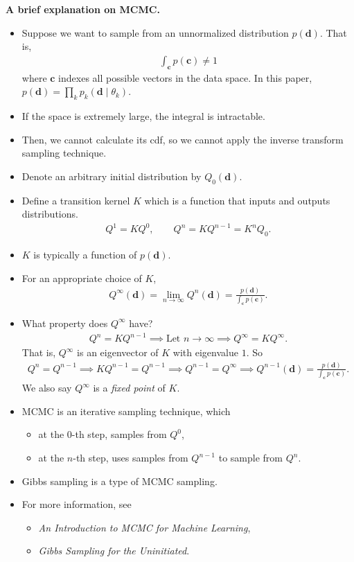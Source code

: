 \documentclass[10pt]{article}
\begin{document}
\textbf{A brief explanation on MCMC.}
\begin{itemize}
\item Suppose we want to sample from an unnormalized distribution $p(\mathbf{d})$. That is,
\begin{align*}
\int_\mathbf{c} p(\mathbf{c}) \neq 1
\end{align*}
where $\mathbf{c}$ indexes all possible vectors in the data space. In this paper, $p(\mathbf{d}) = \prod_k p_k(\mathbf{d} \mid \theta_k)$.
\item If the space is extremely large, the integral is intractable.
\item Then, we cannot calculate its cdf, so we cannot apply the inverse transform sampling technique.
\item Denote an arbitrary initial distribution by $Q_0(\mathbf{d})$.
\item Define a transition kernel $K$ which is a function that inputs and outputs distributions.
\begin{align*}
Q^1 = K Q^0, \qquad Q^n = K Q^{n - 1} =  K^n Q_0.
\end{align*}
\item $K$ is typically a function of $p(\mathbf{d})$.
\item For an appropriate choice of $K$,
\begin{align*}
Q^\infty(\mathbf{d}) = \lim_{n \rightarrow \infty} Q^n(\mathbf{d}) = \frac{p(\mathbf{d})}{\int_\mathbf{c} p(\mathbf{c})}.
\end{align*}
\item What property does $Q^\infty$ have?
\begin{align*}
Q^n = KQ^{n - 1} \implies \text{Let } n \rightarrow \infty \implies Q^\infty = KQ^\infty.
\end{align*}
That is, $Q^\infty$ is an eigenvector of $K$ with eigenvalue $1$. So
\begin{align*}
Q^n = Q^{n - 1} \implies KQ^{n - 1} = Q^{n - 1} \implies Q^{n - 1} = Q^\infty \implies Q^{n - 1}(\mathbf{d}) = \frac{p(\mathbf{d})}{\int_\mathbf{c} p(\mathbf{c})}.
\end{align*}
We also say $Q^\infty$ is a \textit{fixed point} of $K$.
\item MCMC is an iterative sampling technique, which
\begin{itemize}
\item at the $0$-th step, samples from $Q^0$,
\item at the $n$-th step, uses samples from $Q^{n - 1}$ to sample from $Q^n$.
\end{itemize}
\item Gibbs sampling is a type of MCMC sampling.
\item For more information, see
\begin{itemize}
\item \textit{An Introduction to MCMC for Machine Learning},
\item \textit{Gibbs Sampling for the Uninitiated}.
\end{itemize}
\end{itemize}
\end{document}
